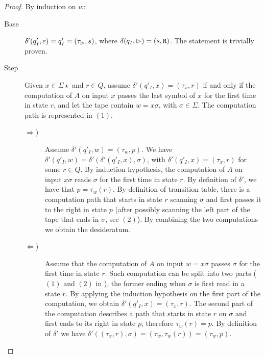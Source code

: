 \begin{proof}
	By induction on $w$:
	\begin{description}
		\item[Base] $\delta'(q'_I,\varepsilon)=q'_I=(\tau_\rhd,s)$, where $\delta(q_I,\rhd)=(s,\mathtt R)$. The statement is trivially proven.
		\item[Step] Given $x\in\Sigma\star$ and $r\in Q$, assume $\delta'(q'_I,x)=(\tau_x,r)$ if and only if the computation of $A$ on input $x$ passes the last symbol of $x$ for the first time in state $r$, and let the tape contain $w=x\sigma$, with $\sigma\in\Sigma$. The computation path is represented in  $(1)$.
		      \begin{description}
			      \item[$\Rightarrow$)] Assume $\delta'(q'_I,w)=(\tau_w,p)$.
			            We have $\delta'(q'_I,w)=\delta'(\delta'(q'_I,x),\sigma)$, with $\delta'(q'_I,x)=(\tau_x,r)$ for some $r\in Q$.
			            By induction hypothesis, the computation of $A$ on input $x\sigma$ reads $\sigma$ for the first time in state $r$.
			            By definition of $\delta'$, we have that $p=\tau_w(r)$.
			            By definition of transition table, there is a computation path that starts in state $r$ scanning $\sigma$ and first passes it to the right in state $p$ (after possibly scanning the left part of the tape that ends in $\sigma$, see  $(2)$).
			            By combining the two computations we obtain the desideratum.
			      \item[$\Leftarrow$)] Assume that the computation of $A$ on input $w=x\sigma$ passes $\sigma$ for the first time in state $r$.
			            Such computation can be split into two parts ($(1)$ and $(2)$ in ), the former ending when $\sigma$ is first read in a state $r$.
			            By applying the induction hypothesis on the first part of the computation, we obtain $\delta'(q'_I,x)=(\tau_x,r)$.
			            The second part of the computation describes a path that starts in state $r$ on $\sigma$ and first ends to its right in state $p$, therefore $\tau_w(r)=p$.
			            By definition of $\delta'$ we have $\delta'((\tau_x,r),\sigma)=(\tau_w,\tau_w(r))=(\tau_w,p)$. \qedhere
		      \end{description}
	\end{description}
\end{proof}

